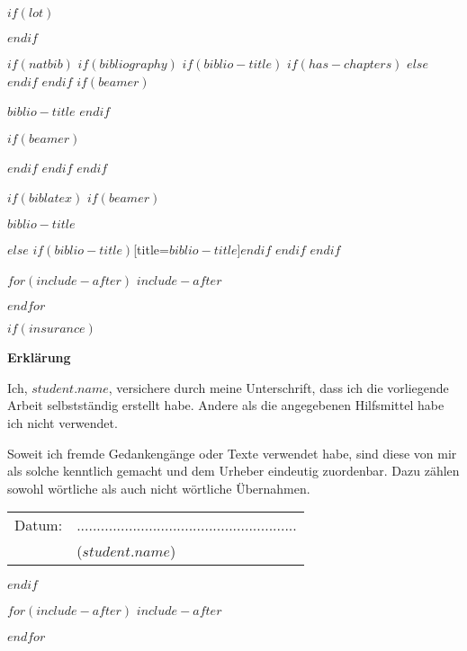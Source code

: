 \documentclass[
    12pt,
    a4paper,
    $if(lang)$
    $babel-lang$,
    $endif$
    bibliography=totocnumbered,
    listof=totocnumbered,
    toc=flat
]{scrartcl}
\def \studentname{$student.firstname$ $student.lastname$}
\def \studentname{$student.name$}
\begin{document}
$if(lot)$
\listoftables
\pagebreak
$endif$


$if(natbib)$
    $if(bibliography)$
        $if(biblio-title)$
            $if(has-chapters)$
\renewcommand\bibname{$biblio-title$}
            $else$
\renewcommand\refname{$biblio-title$}
            $endif$
        $endif$
        $if(beamer)$
\begin{frame}[allowframebreaks]{$biblio-title$}
  \bibliographytrue
        $endif$
  
        $if(beamer)$
\end{frame}
        $endif$
    $endif$
$endif$

$if(biblatex)$
    $if(beamer)$
\begin{frame}[allowframebreaks]{$biblio-title$}
  \bibliographytrue
  \printbibliography[heading=none]
\end{frame}
    $else$
\printbibliography$if(biblio-title)$[title=$biblio-title$]$endif$
    $endif$
$endif$

$for(include-after)$
$include-after$

$endfor$

$if(insurance)$
\newpage
\thispagestyle{empty}
\begin{center}
	\vspace*{5em}
	\huge\textbf{Erklärung}\\
\end{center}
\vspace{2em}
Ich, \studentname,  versichere  durch  meine  Unterschrift,  dass  ich  die  vorliegende Arbeit selbstständig erstellt habe. Andere als die angegebenen Hilfsmittel habe ich nicht verwendet. 

Soweit  ich  fremde  Gedankengänge  oder  Texte  verwendet  habe,  sind  diese  von  mir  als solche kenntlich gemacht und dem Urheber eindeutig zuordenbar. Dazu zählen sowohl wörtliche als auch nicht wörtliche Übernahmen.

\vspace{4em}
\begin{minipage}{\linewidth}
	\begin{tabular}{p{15em}p{15em}}
		Datum: &  .......................................................\\
		& \centering (\studentname)\\
	\end{tabular}
\end{minipage}
$endif$

$for(include-after)$
$include-after$

$endfor$
\end{document}
